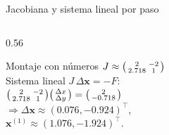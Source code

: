 \documentclass[aspectratio=169,10pt]{beamer}
\begin{document}
\begin{frame}{Jacobiana y sistema lineal por paso}
\begin{columns}[T]
\begin{column}{0.56\textwidth}
\begin{cardgear}{Montaje con números}{\faCalculator}
{$J\approx\begin{psmallmatrix}2&-2\\ 2.718&1\end{psmallmatrix}$\\[1.8mm]
Sistema lineal $J\,\Delta\mathbf x=-F$:\\[0.6mm]
$\begin{psmallmatrix}2&-2\\ 2.718&1\end{psmallmatrix}\begin{psmallmatrix}\Delta x\\ \Delta y\end{psmallmatrix}=\begin{psmallmatrix}2\\ -0.718\end{psmallmatrix}$\\[1.4mm]
$\Rightarrow\Delta\mathbf x\approx(0.076,-0.924)^{\!\top}$,\\[0.4mm]
$\mathbf x^{(1)}\approx(1.076,-1.924)^{\!\top}$.}
\end{cardgear}
\end{column}
\end{columns}
\end{frame}
\end{document}
